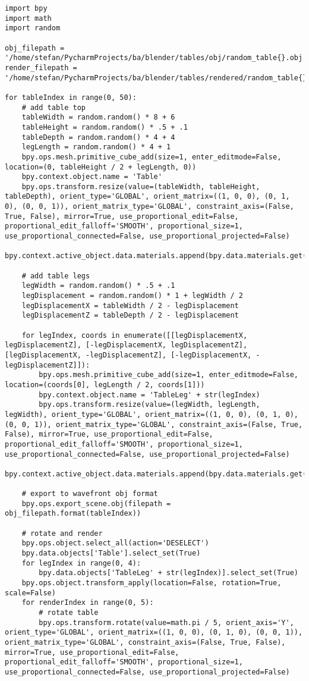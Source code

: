 \begin{lstlisting}
import bpy
import math
import random

obj_filepath = '/home/stefan/PycharmProjects/ba/blender/tables/obj/random_table{}.obj'
render_filepath = '/home/stefan/PycharmProjects/ba/blender/tables/rendered/random_table{}_render{}.jpg'

for tableIndex in range(0, 50):
    # add table top
    tableWidth = random.random() * 8 + 6
    tableHeight = random.random() * .5 + .1
    tableDepth = random.random() * 4 + 4
    legLength = random.random() * 4 + 1
    bpy.ops.mesh.primitive_cube_add(size=1, enter_editmode=False, location=(0, tableHeight / 2 + legLength, 0))
    bpy.context.object.name = 'Table'
    bpy.ops.transform.resize(value=(tableWidth, tableHeight, tableDepth), orient_type='GLOBAL', orient_matrix=((1, 0, 0), (0, 1, 0), (0, 0, 1)), orient_matrix_type='GLOBAL', constraint_axis=(False, True, False), mirror=True, use_proportional_edit=False, proportional_edit_falloff='SMOOTH', proportional_size=1, use_proportional_connected=False, use_proportional_projected=False)
    bpy.context.active_object.data.materials.append(bpy.data.materials.get("Wood"))

    # add table legs
    legWidth = random.random() * .5 + .1
    legDisplacement = random.random() * 1 + legWidth / 2
    legDisplacementX = tableWidth / 2 - legDisplacement
    legDisplacementZ = tableDepth / 2 - legDisplacement

    for legIndex, coords in enumerate([[legDisplacementX, legDisplacementZ], [-legDisplacementX, legDisplacementZ], [legDisplacementX, -legDisplacementZ], [-legDisplacementX, -legDisplacementZ]]):
        bpy.ops.mesh.primitive_cube_add(size=1, enter_editmode=False, location=(coords[0], legLength / 2, coords[1]))
        bpy.context.object.name = 'TableLeg' + str(legIndex)
        bpy.ops.transform.resize(value=(legWidth, legLength, legWidth), orient_type='GLOBAL', orient_matrix=((1, 0, 0), (0, 1, 0), (0, 0, 1)), orient_matrix_type='GLOBAL', constraint_axis=(False, True, False), mirror=True, use_proportional_edit=False, proportional_edit_falloff='SMOOTH', proportional_size=1, use_proportional_connected=False, use_proportional_projected=False)
        bpy.context.active_object.data.materials.append(bpy.data.materials.get("Wood"))

    # export to wavefront obj format
    bpy.ops.export_scene.obj(filepath = obj_filepath.format(tableIndex))

    # rotate and render
    bpy.ops.object.select_all(action='DESELECT')
    bpy.data.objects['Table'].select_set(True)
    for legIndex in range(0, 4):
        bpy.data.objects['TableLeg' + str(legIndex)].select_set(True)
    bpy.ops.object.transform_apply(location=False, rotation=True, scale=False)
    for renderIndex in range(0, 5):
        # rotate table
        bpy.ops.transform.rotate(value=math.pi / 5, orient_axis='Y', orient_type='GLOBAL', orient_matrix=((1, 0, 0), (0, 1, 0), (0, 0, 1)), orient_matrix_type='GLOBAL', constraint_axis=(False, True, False), mirror=True, use_proportional_edit=False, proportional_edit_falloff='SMOOTH', proportional_size=1, use_proportional_connected=False, use_proportional_projected=False)


\end{lstlisting}

